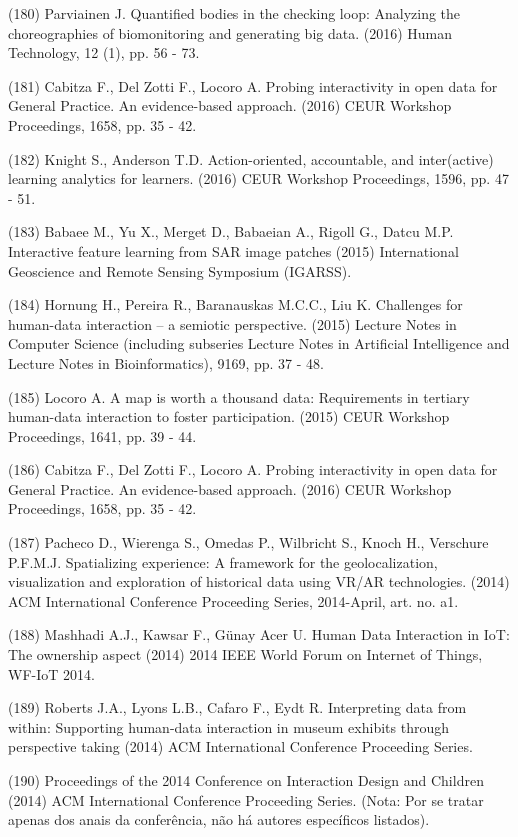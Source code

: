 \documentclass[
	12pt,				%
	oneside,			%
	a4paper,			%
	english,			%
	brazil				%
	]{abntex2ppgsi}
\begin{document}
\begin{apendicesenv}
(180) Parviainen J. Quantified bodies in the checking loop: Analyzing the choreographies of biomonitoring and generating big data. (2016) Human Technology, 12 (1), pp. 56 - 73.

(181) Cabitza F., Del Zotti F., Locoro A. Probing interactivity in open data for General Practice. An evidence-based approach. (2016) CEUR Workshop Proceedings, 1658, pp. 35 - 42.

(182) Knight S., Anderson T.D. Action-oriented, accountable, and inter(active) learning analytics for learners. (2016) CEUR Workshop Proceedings, 1596, pp. 47 - 51.

(183) Babaee M., Yu X., Merget D., Babaeian A., Rigoll G., Datcu M.P. Interactive feature learning from SAR image patches (2015) International Geoscience and Remote Sensing Symposium (IGARSS).

(184) Hornung H., Pereira R., Baranauskas M.C.C., Liu K. Challenges for human-data interaction – a semiotic perspective. (2015) Lecture Notes in Computer Science (including subseries Lecture Notes in Artificial Intelligence and Lecture Notes in Bioinformatics), 9169, pp. 37 - 48.

(185) Locoro A. A map is worth a thousand data: Requirements in tertiary human-data interaction to foster participation. (2015) CEUR Workshop Proceedings, 1641, pp. 39 - 44.

(186) Cabitza F., Del Zotti F., Locoro A. Probing interactivity in open data for General Practice. An evidence-based approach. (2016) CEUR Workshop Proceedings, 1658, pp. 35 - 42.

(187) Pacheco D., Wierenga S., Omedas P., Wilbricht S., Knoch H., Verschure P.F.M.J. Spatializing experience: A framework for the geolocalization, visualization and exploration of historical data using VR/AR technologies. (2014) ACM International Conference Proceeding Series, 2014-April, art. no. a1.

(188) Mashhadi A.J., Kawsar F., Günay Acer U. Human Data Interaction in IoT: The ownership aspect (2014) 2014 IEEE World Forum on Internet of Things, WF-IoT 2014.

(189) Roberts J.A., Lyons L.B., Cafaro F., Eydt R. Interpreting data from within: Supporting human-data interaction in museum exhibits through perspective taking (2014) ACM International Conference Proceeding Series.

(190) Proceedings of the 2014 Conference on Interaction Design and Children (2014) ACM International Conference Proceeding Series. (Nota: Por se tratar apenas dos anais da conferência, não há autores específicos listados).


\end{apendicesenv}
\end{document}
